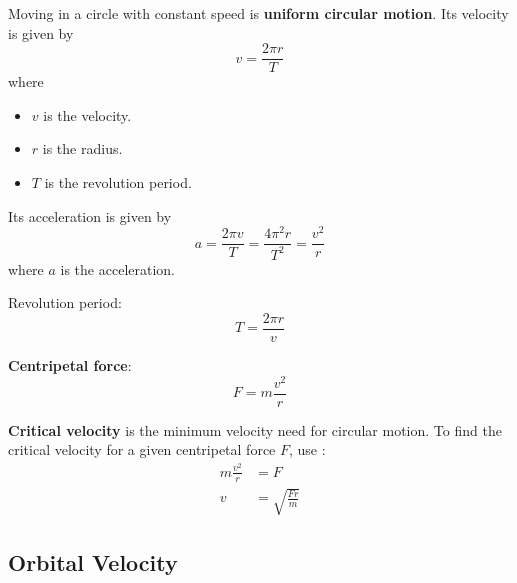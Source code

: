 \documentclass[a4paper, titlepage]{book}
\begin{document}
Moving in a circle with constant speed is \textbf{uniform circular motion}.
Its velocity is given by
\begin{equation}
    v = \frac{2 \pi r}{T}
\end{equation}
where
\begin{itemize}
    \item \(v\) is the velocity.
    \item \(r\) is the radius.
    \item \(T\) is the revolution period.
\end{itemize}
Its acceleration is given by
\begin{equation} \label{eq:centripetal-acceleration}
    a = \frac{2 \pi v}{T} = \frac{4 \pi ^2 r}{T^2} = \frac{v^2}{r}
\end{equation}
where \(a\) is the acceleration.

Revolution period:
\begin{equation} \label{eq:revolution-period}
    T = \frac{2 \pi r}{v}
\end{equation}

\textbf{Centripetal force}:
\begin{equation} \label{eq:centripetal-force}
    F = m \frac{v^2}{r}
\end{equation}

\textbf{Critical velocity} is the minimum velocity need for circular motion.
To find the critical velocity for a given centripetal force \(F\),
use :
\begin{equation}
    \begin{aligned}
        m \frac{v^2}{r} &= F \\
        v &= \sqrt{\frac{F r}{m}}
    \end{aligned}
\end{equation}

\subsection{Orbital Velocity}
\end{document}
